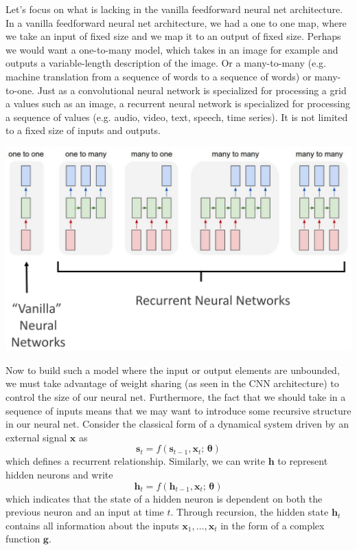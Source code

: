 \documentclass{article}
\theoremstyle{definition}
\theoremstyle{remark}
\theoremstyle{definition}
\begin{document}
Let's focus on what is lacking in the vanilla feedforward neural net architecture. In a vanilla feedforward neural net architecture, we had a one to one map, where we take an input of fixed size and we map it to an output of fixed size. Perhaps we would want a one-to-many model, which takes in an image for example and outputs a variable-length description of the image. Or a many-to-many (e.g. machine translation from a sequence of words to a sequence of words) or many-to-one. Just as a convolutional neural network is specialized for processing a grid a values such as an image, a recurrent neural network is specialized for processing a sequence of values (e.g. audio, video, text, speech, time series). It is not limited to a fixed size of inputs and outputs. 
\begin{center}
    \includegraphics[scale=0.25]{Images/RNNs/NNs_vs_RNN.png}
\end{center}
Now to build such a model where the input or output elements are unbounded, we must take advantage of weight sharing (as seen in the CNN architecture) to control the size of our neural net. Furthermore, the fact that we should take in a sequence of inputs means that we may want to introduce some recursive structure in our neural net. Consider the classical form of a dynamical system driven by an external signal $\mathbf{x}$ as 
\[\mathbf{s}_t = f(\mathbf{s}_{t-1}, \mathbf{x}_t; \, \boldsymbol{\theta} )\]
which defines a recurrent relationship. Similarly, we can write $\mathbf{h}$ to represent hidden neurons and write 
\[\mathbf{h}_t = f(\mathbf{h}_{t-1}, \mathbf{x}_t; \, \boldsymbol{\theta} )\]
which indicates that the state of a hidden neuron is dependent on both the previous neuron and an input at time $t$. Through recursion, the hidden state $\mathbf{h}_t$ contains all information about the inputs $\mathbf{x}_1, \ldots, \mathbf{x}_t$ in the form of a complex function $\mathbf{g}$. 
\end{document}
